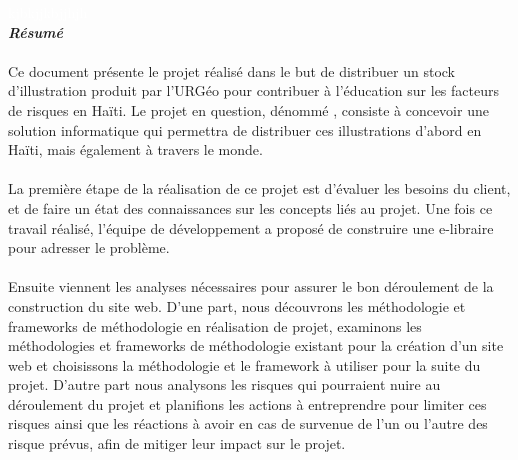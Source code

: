 \newpage

\begin{center}
	\textcolor{white}{kjbkjjkbjjhjh}\\
\vspace{2cm}
\textbf{\textit{\Huge{\textcolor{myblue}{R\'esum\'e}}}}
\vspace{2cm}
    
    \begin{minipage}{0.75\textwidth}
    	
	    \paragraph{}Ce document pr\'esente le projet r\'ealis\'e dans le but de distribuer un stock d'illustration produit par l'URG\'eo pour contribuer \`a l'\'education sur les facteurs de risques en Ha\"iti. Le projet en question, d\'enomm\'e \texttt{\projectName}, consiste \`a concevoir une solution informatique qui permettra de distribuer ces illustrations d'abord en Ha\"iti, mais \'egalement \`a travers le monde. \vspace{0.5cm}

	    
	    \paragraph{} La premi\`ere \'etape de la r\'ealisation de ce projet est d'\'evaluer les besoins du client, et de faire un \'etat des connaissances sur les concepts li\'es au projet. Une fois ce travail r\'ealis\'e, l'\'equipe de d\'eveloppement a propos\'e de construire une e-libraire pour adresser le probl\`eme.\par
	    \paragraph{}Ensuite viennent les analyses n\'ecessaires pour assurer le bon d\'eroulement de la construction du site web. D'une part, nous d\'ecouvrons les m\'ethodologie et frameworks de m\'ethodologie en r\'ealisation de projet, examinons les m\'ethodologies et frameworks de m\'ethodologie existant pour la cr\'eation d'un site web et choisissons la m\'ethodologie et le framework \`a utiliser pour la suite du projet. D'autre part nous analysons les risques qui pourraient nuire au d\'eroulement du projet et planifions les actions \`a entreprendre pour limiter ces risques ainsi que les r\'eactions \`a avoir en cas de survenue de l'un ou l'autre des risque pr\'evus, afin de mitiger leur impact sur le projet.\par

\end{minipage}
\end{center}
